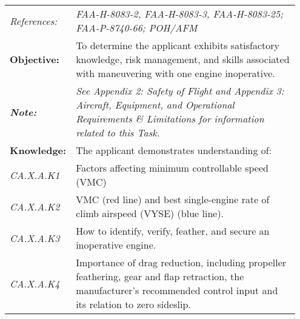 {\begin{table}[H]
\centering
\begin{tabular}%
  {>{\raggedleft\arraybackslash}p{0.15\linewidth}%
   >{\raggedright\arraybackslash}p{0.8\linewidth}%
  }
\textit{References:}                                                & \textit{FAA-H-8083-2, FAA-H-8083-3, FAA-H-8083-25; FAA-P-8740-66; POH/AFM}                                                                                              \\
\textbf{Objective:}                                                 & To determine the applicant exhibits satisfactory knowledge, risk management, and skills associated with maneuvering with one engine inoperative.                        \\
\textit{\textbf{Note:}}                                             & \textit{See Appendix 2: Safety of Flight and Appendix 3: Aircraft, Equipment, and Operational Requirements \& Limitations for information related to this Task.}        \\ \hline
\textbf{Knowledge:}                                                 & The applicant demonstrates understanding of:                                                                                                                            \\
\textit{CA.X.A.K1}                                                 & Factors affecting minimum controllable speed (VMC)                                                                                                                      \\
\textit{CA.X.A.K2}                                                 & VMC (red line) and best single-engine rate of climb airspeed (VYSE) (blue line).                                                                                        \\
\textit{CA.X.A.K3}                                                 & How to identify, verify, feather, and secure an inoperative engine.                                                                                                     \\
\textit{CA.X.A.K4}                                                 & Importance of drag reduction, including propeller feathering, gear and flap retraction, the manufacturer's recommended control input and its relation to zero sideslip. \\

\end{tabular}
\end{table}}
